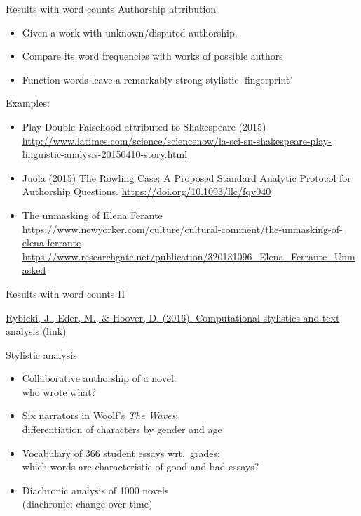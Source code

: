 \documentclass[aspectratio=169,usenames,dvipsnames]{beamer}
\begin{document}
\begin{frame}{Results with word counts}
    Authorship attribution
    \begin{itemize}
        \item Given a work with unknown/disputed authorship,
        \item Compare its word frequencies with works of possible authors
        \item Function words leave a remarkably strong stylistic `fingerprint'
    \end{itemize}

    \pause
    Examples:
    \begin{itemize}
        \item Play Double Falsehood attributed to Shakespeare (2015) \\%
            {\small \url{http://www.latimes.com/science/sciencenow/la-sci-sn-shakespeare-play-linguistic-analysis-20150410-story.html}}

        \item Juola (2015) The Rowling Case: A Proposed Standard Analytic Protocol for Authorship Questions. %
            \url{https://doi.org/10.1093/llc/fqv040}
        \item The unmasking of Elena Ferante \\
            {\small \url{https://www.newyorker.com/culture/cultural-comment/the-unmasking-of-elena-ferrante}}
            \\
            {\small\url{https://www.researchgate.net/publication/320131096_Elena_Ferrante_Unmasked}}
    \end{itemize}
\end{frame}

\begin{frame}{Results with word counts II}
    \begin{reference}
        \href{http://www.infotext.unisi.it/upload/rybickihoovereder_with_figures.pdf}{Rybicki, J., Eder, M., \& Hoover, D. (2016). Computational stylistics and text analysis (link)}
    \end{reference}
    Stylistic analysis
    \begin{itemize}
    \item Collaborative authorship of a novel:\\
        who wrote what?
    \item Six narrators in Woolf's \emph{The Waves}:\\
        differentiation of characters by gender and age
    \item Vocabulary of 366 student essays wrt.\ grades:\\
        which words are characteristic of good and bad essays?
    \item Diachronic analysis of 1000 novels\\
        (diachronic: change over time)
    \end{itemize}
\end{frame}
\end{document}
